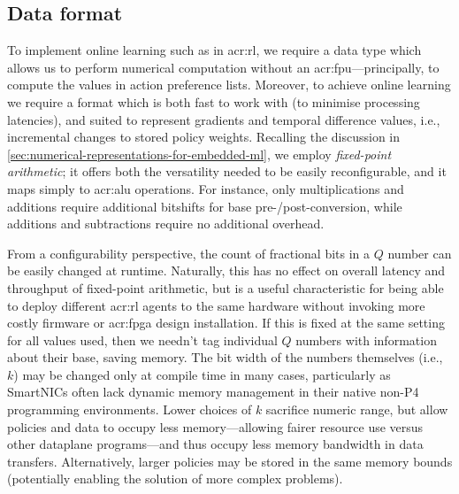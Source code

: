 \subsection{Data format}\label{sec:opal-data-format}
To implement online learning such as in \gls{acr:rl}, we require a data type which allows us to perform numerical computation without an \gls{acr:fpu}---principally, to compute the values in action preference lists.
Moreover, to achieve online learning we require a format which is both fast to work with (to minimise processing latencies), and suited to represent gradients and temporal difference values, i.e., incremental changes to stored policy weights.
Recalling the discussion in \cref{sec:numerical-representations-for-embedded-ml}, we employ \emph{fixed-point arithmetic}; it offers both the versatility needed to be easily reconfigurable, and it maps simply to \gls{acr:alu} operations.
For instance, only multiplications and additions require additional bitshifts for base pre-/post-conversion, while additions and subtractions require no additional overhead.


From a configurability perspective, the count of fractional bits in a $Q$ number can be easily changed at runtime.
Naturally, this has no effect on overall latency and throughput of fixed-point arithmetic, but is a useful characteristic for being able to deploy different \gls{acr:rl} agents to the same hardware without invoking more costly firmware or \gls{acr:fpga} design installation.
If this is fixed at the same setting for all values used, then we needn't tag individual $Q$ numbers with information about their base, saving memory.
The bit width of the numbers themselves (i.e., $k$) may be changed only at compile time in many cases, particularly as SmartNICs often lack dynamic memory management in their native non-P4 programming environments.
Lower choices of $k$ sacrifice numeric range, but allow policies and data to occupy less memory---allowing fairer resource use versus other dataplane programs---and thus occupy less memory bandwidth in data transfers.
Alternatively, larger policies may be stored in the same memory bounds (potentially enabling the solution of more complex problems).

